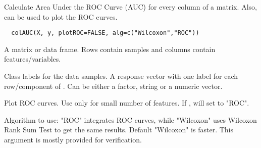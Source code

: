 \begin{Description}\relax
Calculate Area Under the ROC Curve (AUC) for every column of a 
matrix. Also, can be used to plot the ROC curves.
\end{Description}
\begin{Usage}
\begin{verbatim}
  colAUC(X, y, plotROC=FALSE, alg=c("Wilcoxon","ROC"))
\end{verbatim}
\end{Usage}
\begin{Arguments}
\begin{ldescription}
\item[\code{X}] A matrix or data frame. Rows contain samples 
and columns contain features/variables.
\item[\code{y}] Class labels for the  data samples. 
A response vector with one label for each row/component of .
Can be either a factor, string or a numeric vector.
\item[\code{plotROC}] Plot ROC curves. Use only for small number of features. 
If , will set  to "ROC".
\item[\code{alg}] Algorithm to use: "ROC" integrates ROC curves, while "Wilcoxon"
uses Wilcoxon Rank Sum Test to get the same results. Default "Wilcoxon" is
faster. This argument is mostly provided for verification.
\end{ldescription}
\end{Arguments}
